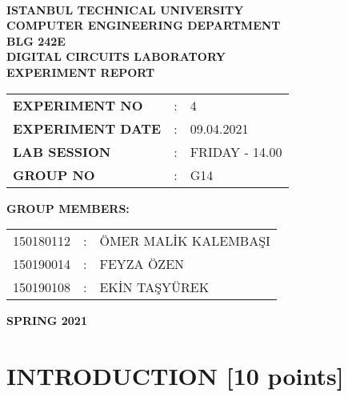 \documentclass[pdftex,12pt,a4paper]{article}
\begin{document}
\begin{titlepage}
\begin{center}
\textbf{}\\
\textbf{\Large{ISTANBUL TECHNICAL UNIVERSITY}}\\
\vspace{0.5cm}
\textbf{\Large{COMPUTER ENGINEERING DEPARTMENT}}\\
\vspace{2cm}
\textbf{\Large{BLG 242E\\ DIGITAL CIRCUITS LABORATORY\\ EXPERIMENT REPORT}}\\
\vspace{2.8cm}
\begin{table}[ht]
\centering
\Large{
\begin{tabular}{lcl}
\textbf{EXPERIMENT NO}  & : & 4 \\
\textbf{EXPERIMENT DATE}  & : & 09.04.2021 \\
\textbf{LAB SESSION}  & : & FRIDAY - 14.00 \\
\textbf{GROUP NO}  & : & G14 \\
\end{tabular}}
\end{table}
\vspace{1cm}
\textbf{\Large{GROUP MEMBERS:}}\\
\begin{table}[ht]
\centering
\Large{
\begin{tabular}{rcl}
150180112  & : & ÖMER MALİK KALEMBAŞI \\
150190014  & : & FEYZA ÖZEN \\
150190108  & : & EKİN TAŞYÜREK \\
\end{tabular}}
\end{table}
\vspace{2.8cm}
\textbf{\Large{SPRING 2021}}

\end{center}

\end{titlepage}

\thispagestyle{empty}
\setcounter{tocdepth}{4}
\tableofcontents
\clearpage

\setcounter{page}{1}

\clearpage
\section{INTRODUCTION [10 points]}
\end{document}
